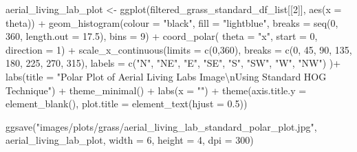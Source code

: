 \documentclass[
  letterpaper,
  DIV=11,
  numbers=noendperiod]{scrreprt}
\newenvironment{Shaded}{\begin{snugshade}}{\end{snugshade}}
\newcommand{\AttributeTok}[1]{\textcolor[rgb]{0.40,0.45,0.13}{#1}}
\newcommand{\DecValTok}[1]{\textcolor[rgb]{0.68,0.00,0.00}{#1}}
\newcommand{\FloatTok}[1]{\textcolor[rgb]{0.68,0.00,0.00}{#1}}
\newcommand{\FunctionTok}[1]{\textcolor[rgb]{0.28,0.35,0.67}{#1}}
\newcommand{\NormalTok}[1]{\textcolor[rgb]{0.00,0.23,0.31}{#1}}
\newcommand{\OtherTok}[1]{\textcolor[rgb]{0.00,0.23,0.31}{#1}}
\newcommand{\SpecialCharTok}[1]{\textcolor[rgb]{0.37,0.37,0.37}{#1}}
\newcommand{\StringTok}[1]{\textcolor[rgb]{0.13,0.47,0.30}{#1}}
\begin{document}
\begin{Shaded}
\begin{Highlighting}[]
\NormalTok{aerial\_living\_lab\_plot }\OtherTok{\textless{}{-}}
  \FunctionTok{ggplot}\NormalTok{(filtered\_grass\_standard\_df\_list[[}\DecValTok{2}\NormalTok{]], }
         \FunctionTok{aes}\NormalTok{(}\AttributeTok{x =}\NormalTok{ theta)) }\SpecialCharTok{+}
  \FunctionTok{geom\_histogram}\NormalTok{(}\AttributeTok{colour =} \StringTok{"black"}\NormalTok{, }
                 \AttributeTok{fill =} \StringTok{"lightblue"}\NormalTok{, }
                 \AttributeTok{breaks =} \FunctionTok{seq}\NormalTok{(}\DecValTok{0}\NormalTok{, }\DecValTok{360}\NormalTok{, }\AttributeTok{length.out =} \FloatTok{17.5}\NormalTok{),}
                 \AttributeTok{bins =} \DecValTok{9}\NormalTok{) }\SpecialCharTok{+}
  \FunctionTok{coord\_polar}\NormalTok{(}
    \AttributeTok{theta =} \StringTok{"x"}\NormalTok{, }
    \AttributeTok{start =} \DecValTok{0}\NormalTok{, }
    \AttributeTok{direction =} \DecValTok{1}\NormalTok{) }\SpecialCharTok{+}
  \FunctionTok{scale\_x\_continuous}\NormalTok{(}\AttributeTok{limits =} \FunctionTok{c}\NormalTok{(}\DecValTok{0}\NormalTok{,}\DecValTok{360}\NormalTok{),}
    \AttributeTok{breaks =} \FunctionTok{c}\NormalTok{(}\DecValTok{0}\NormalTok{, }\DecValTok{45}\NormalTok{, }\DecValTok{90}\NormalTok{, }\DecValTok{135}\NormalTok{, }\DecValTok{180}\NormalTok{, }\DecValTok{225}\NormalTok{, }\DecValTok{270}\NormalTok{, }\DecValTok{315}\NormalTok{), }
    \AttributeTok{labels =} \FunctionTok{c}\NormalTok{(}\StringTok{"N"}\NormalTok{, }\StringTok{"NE"}\NormalTok{, }\StringTok{"E"}\NormalTok{, }\StringTok{"SE"}\NormalTok{, }\StringTok{"S"}\NormalTok{, }\StringTok{"SW"}\NormalTok{, }\StringTok{"W"}\NormalTok{, }\StringTok{"NW"}\NormalTok{)}
\NormalTok{  )}\SpecialCharTok{+}
  \FunctionTok{labs}\NormalTok{(}\AttributeTok{title =} \StringTok{"Polar Plot of Aerial Living Labs Image}\SpecialCharTok{\textbackslash{}n}\StringTok{Using Standard HOG Technique"}\NormalTok{) }\SpecialCharTok{+}
  \FunctionTok{theme\_minimal}\NormalTok{() }\SpecialCharTok{+}
  \FunctionTok{labs}\NormalTok{(}\AttributeTok{x =} \StringTok{""}\NormalTok{) }\SpecialCharTok{+}
  \FunctionTok{theme}\NormalTok{(}\AttributeTok{axis.title.y =} \FunctionTok{element\_blank}\NormalTok{(),}
        \AttributeTok{plot.title =} \FunctionTok{element\_text}\NormalTok{(}\AttributeTok{hjust =} \FloatTok{0.5}\NormalTok{))}

\FunctionTok{ggsave}\NormalTok{(}\StringTok{"images/plots/grass/aerial\_living\_lab\_standard\_polar\_plot.jpg"}\NormalTok{, aerial\_living\_lab\_plot, }\AttributeTok{width =} \DecValTok{6}\NormalTok{, }\AttributeTok{height =} \DecValTok{4}\NormalTok{, }\AttributeTok{dpi =} \DecValTok{300}\NormalTok{)}
\end{Highlighting}
\end{Shaded}
\end{document}
